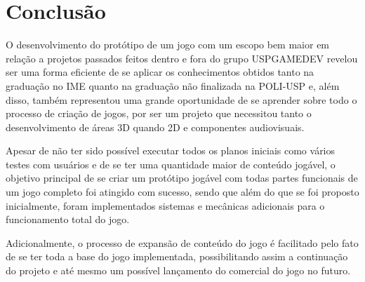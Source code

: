 \chapter{Conclusão}

	O desenvolvimento do protótipo de um jogo com um escopo bem maior em relação a projetos passados feitos dentro e fora do grupo USPGAMEDEV revelou ser uma forma eficiente de se aplicar os conhecimentos obtidos tanto na graduação no IME quanto na graduação não finalizada na POLI-USP e, além disso, também representou uma grande oportunidade de se aprender sobre todo o processo de criação de jogos, por ser um projeto que necessitou tanto o desenvolvimento de áreas 3D quando 2D e componentes audiovisuais.
	
	Apesar de não ter sido possível executar todos os planos iniciais como vários testes com usuários e de se ter uma quantidade maior de conteúdo jogável, o objetivo principal de se criar um protótipo jogável com todas partes funcionais de um jogo completo foi atingido com sucesso, sendo que além do que se foi proposto inicialmente, foram implementados sistemas e mecânicas adicionais para o funcionamento total do jogo.
	
	Adicionalmente, o processo de expansão de conteúdo do jogo é facilitado pelo fato de se ter toda a base do jogo implementada, possibilitando assim a continuação do projeto e até mesmo um possível lançamento do comercial do jogo no futuro.







%
%





